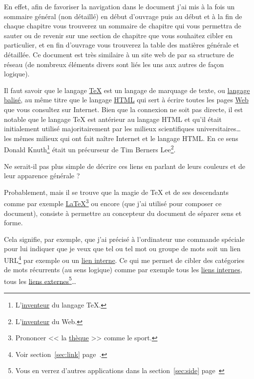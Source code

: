 En effet, afin de favoriser la navigation dans le document j'ai mis à la
fois un sommaire général (non détaillé) en début d'ouvrage puis au début
et à la fin de chaque chapitre vous trouverez un sommaire de chapitre
qui vous permettra de sauter ou de revenir sur une section de chapitre
que vous souhaitez cibler en particulier, et en fin d'ouvrage vous
trouverez la table des matières générale et détaillée. Ce document est très
similaire à un site web de par sa structure de réseau (de nombreux
éléments divers sont liés les uns aux autres de façon logique).

Il faut savoir que le langage
\href{https://fr.wikipedia.org/wiki/TeX}{\TeX} est un langage de
marquage de texte, ou \underline{langage balisé}, au même titre que le 
langage \href{https://fr.wikipedia.org/wiki/Langage_de_balisage\#Langage_HTML}{HTML}
qui sert à écrire toutes les pages  \href{https://fr.wikipedia.org/wiki/World_Wide_Web}{Web}
que vous consultez sur Internet. Bien que la connexion ne soit pas
directe, il est notable que le langage \TeX{} est antérieur au langage
HTML et qu'il était initialement utilisé majoritairement par les
milieux scientifiques universitaires\dots\xspace{} les mêmes milieux qui ont
fait naître Internet et le langage HTML. En ce sens Donald
Knuth\footnote{L'\href{https://fr.wikipedia.org/wiki/Donald_Knuth}{inventeur} du langage \TeX{}.} était un précurseur de
Tim Berners Lee\footnote{L'\href{https://fr.wikipedia.org/wiki/Tim_Berners-Lee}{inventeur} du Web.}.

Ne serait-il pas plus simple de décrire ces liens en parlant de leurs
couleurs et de leur apparence générale ?

Probablement, mais il se trouve que la magie de \TeX{} et de ses
descendants comme par exemple
\href{https://fr.wikipedia.org/wiki/LaTeX}{\LaTeX}\footnote{Prononcer
  << la
  \href{https://fr.wikipedia.org/wiki/Th\%C3\%A8que_(sport)}{thèque}
  >> comme le sport.} ou encore 
\href{https://en.wikipedia.org/wiki/XeTeX}{\XeLaTeX} (que j'ai utilisé
pour composer ce document), consiste à
permettre au concepteur du document de séparer sens et forme. 

Cela signifie, par exemple, que j'ai précisé à l'ordinateur une
commande spéciale pour lui indiquer que je veux que tel ou tel mot ou
groupe de mots soit un lien URL\footnote{Voir
  section~\ref{sec:link}   page~\pageref{sec:link}.} par exemple ou un
\hyperlink{url}{lien interne}. Ce qui me permet de cibler des catégories de mots
récurrents (au sens logique) comme par exemple tous les \hyperlink{url}{liens
internes}, tous les \href{https://fr.wikipedia.org/wiki/Uniform_Resource_Locator}{liens externes}\footnote{Vous en verrez d'autres
  applications dans la section~\ref{sec:side}
  page~\pageref{sec:side}}\dots\xspace  

